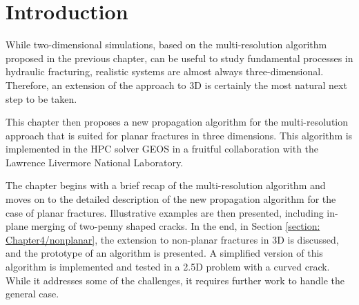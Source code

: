 \section{Introduction}
\label{section: Chapter4/intro}

While two-dimensional simulations, based on the multi-resolution algorithm proposed in the previous chapter, can be useful to study fundamental processes in hydraulic fracturing, realistic systems are almost always three-dimensional. Therefore, an extension of the approach to 3D is certainly the most natural next step to be taken. 

This chapter then proposes a new propagation algorithm for the multi-resolution approach that is suited for planar fractures in three dimensions. This algorithm is implemented in the HPC solver GEOS \cite{settgast2012simulation,settgast2014simulation,settgast2017fully} in a fruitful collaboration with the Lawrence Livermore National Laboratory. 

The chapter begins with a brief recap of the multi-resolution algorithm and moves on to the detailed description of the new propagation algorithm for the case of planar fractures. Illustrative examples are then presented, including in-plane merging of two-penny shaped cracks. In the end, in Section \ref{section: Chapter4/nonplanar}, the extension to non-planar fractures in 3D is discussed, and the prototype of an algorithm is presented. A simplified version of this algorithm is implemented and tested in a 2.5D problem with a curved crack. While it addresses some of the challenges, it requires further work to handle the general case.